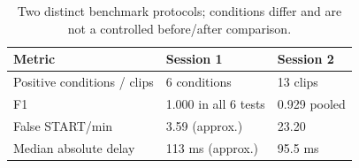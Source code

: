 \begin{table}[t]
\centering
\caption{Two distinct benchmark protocols; conditions differ and are not a controlled before/after comparison.}
\label{tab:pinch-overview}
\footnotesize
\setlength{\tabcolsep}{3pt}
\begin{tabular}{lll}
\hline
Metric & Session 1 & Session 2 \\
\hline
Positive conditions / clips & 6 conditions & 13 clips \\
F1 & 1.000 in all 6 tests & 0.929 pooled \\
False START/min & 3.59 (approx.) & 23.20 \\
Median absolute delay & 113 ms (approx.) & 95.5 ms \\
\hline
\end{tabular}
\end{table}
